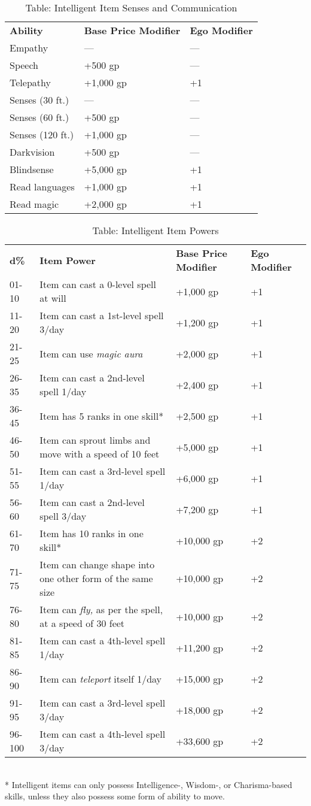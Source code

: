 \begin{table}[]
\sffamily
\caption{Table: Intelligent Item Senses and Communication}
\begin{tabular}{lll}
\textbf{Ability} & \textbf{Base Price Modifier} & \textbf{Ego Modifier}\\
Empathy & --- & --- \\
Speech & +500 gp & --- \\
Telepathy & +1,000 gp & +1 \\
Senses (30 ft.) & --- & --- \\
Senses (60 ft.) & +500 gp & --- \\
Senses (120 ft.) & +1,000 gp & --- \\
Darkvision & +500 gp & --- \\
Blindsense & +5,000 gp & +1 \\
Read languages & +1,000 gp & +1\\
Read magic  & +2,000 gp & +1\\
\end{tabular}
\end{table}
\begin{table*}[]
\sffamily
\caption{Table: Intelligent Item Powers}
\begin{tabularx}{\linewidth}{lXll}
\textbf{d\%} & \textbf{Item Power} & \textbf{Base Price Modifier} & \textbf{Ego Modifier}\\
01-10 & Item can cast a 0-level spell at will & +1,000 gp & +1 \\
 11-20 & Item can cast a 1st-level spell 3/day & +1,200 gp & +1 \\
 21-25 & Item can use \textit{magic aura} & +2,000 gp & +1 \\
 26-35 & Item can cast a 2nd-level spell 1/day & +2,400 gp & +1 \\
 36-45 & Item has 5 ranks in one skill* & +2,500 gp & +1 \\
 46-50 & Item can sprout limbs and move with a speed of 10 feet & +5,000 gp & +1 \\
 51-55 & Item can cast a 3rd-level spell 1/day & +6,000 gp & +1 \\
 56-60 & Item can cast a 2nd-level spell 3/day & +7,200 gp & +1 \\
 61-70 & Item has 10 ranks in one skill* & +10,000 gp & +2 \\
 71-75 & Item can change shape into one other form of the same size & +10,000 gp & +2 \\
 76-80 & Item can \textit{fly, }as per the spell, at a speed of 30 feet & +10,000 gp & +2 \\
 81-85 & Item can cast a 4th-level spell 1/day & +11,200 gp & +2 \\
 86-90 & Item can \textit{teleport} itself 1/day & +15,000 gp & +2 \\
 91-95 & Item can cast a 3rd-level spell 3/day & +18,000 gp & +2 \\
 96-100 & Item can cast a 4th-level spell 3/day & +33,600 gp & +2\\
\end{tabularx}\\
* Intelligent items can only possess Intelligence-, Wisdom-, or Charisma-based skills, unless they also possess some form of ability to move.
\end{table*}
